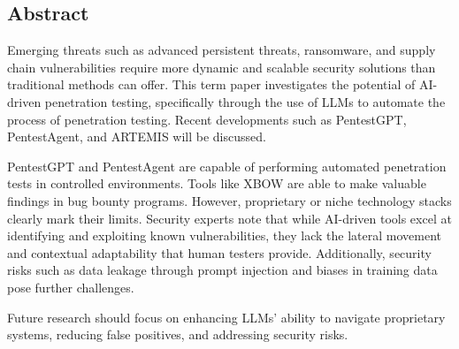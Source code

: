 

\begin{otherlanguage}{american}
	\chapter*{Abstract}
	Emerging threats such as advanced persistent threats, ransomware, and supply chain vulnerabilities require more dynamic and scalable security solutions than traditional methods can offer. This term paper investigates the potential of \ac{AI}-driven penetration testing, specifically through the use of \ac{LLM}s to automate the process of penetration testing. Recent developments such as PentestGPT, PentestAgent, and ARTEMIS will be discussed.
	
	PentestGPT and PentestAgent are capable of performing automated penetration tests in controlled environments. Tools like XBOW are able to make valuable findings in bug bounty programs. However, proprietary or niche technology stacks clearly mark their limits. Security experts note that while \ac{AI}-driven tools excel at identifying and exploiting known vulnerabilities, they lack the lateral movement and contextual adaptability that human testers provide. Additionally, security risks such as data leakage through prompt injection and biases in training data pose further challenges.

	Future research should focus on enhancing \ac{LLM}s' ability to navigate proprietary systems, reducing false positives, and addressing security risks.
\end{otherlanguage}
